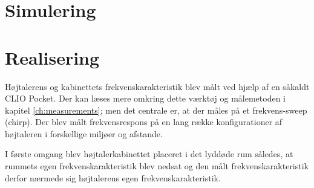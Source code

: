 \section{Simulering}

\newpage
\section{Realisering}
Højtalerens og kabinettets frekvenskarakteristik blev målt ved hjælp af en såkaldt CLIO Pocket. Der kan læses mere omkring dette værktøj og målemetoden i kapitel \ref{ch:measurements}; men det centrale er, at der måles på et frekvens-sweep (chirp). Der blev målt frekvensrespons på en lang række konfigurationer af højtaleren i forskellige miljøer og afstande.

I første omgang blev højtalerkabinettet placeret i det lyddøde rum således, at rummets egen frekvenskarakteristik blev nedsat og den målt frekvenskarakteristik derfor nærmede sig højtalerens egen frekvenskarakteristik.



